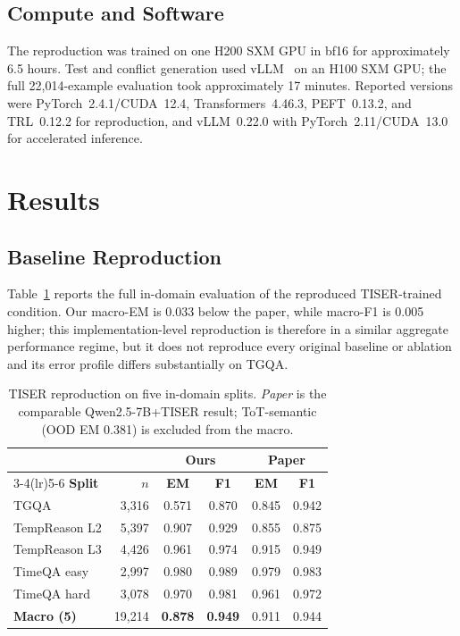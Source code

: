\documentclass[conference]{IEEEtran}
\begin{document}
\subsection{Compute and Software}

The reproduction was trained on one H200 SXM GPU in bf16 for approximately 6.5 hours. Test and conflict generation used vLLM~\cite{kwon2023vllm} on an H100 SXM GPU; the full 22,014-example evaluation took approximately 17 minutes. Reported versions were PyTorch~2.4.1/CUDA~12.4, Transformers~4.46.3, PEFT~0.13.2, and TRL~0.12.2 for reproduction, and vLLM~0.22.0 with PyTorch~2.11/CUDA~13.0 for accelerated inference.

\section{Results}

\subsection{Baseline Reproduction}

Table~\ref{tab:baseline} reports the full in-domain evaluation of the reproduced TISER-trained condition. Our macro-EM is 0.033 below the paper, while macro-F1 is 0.005 higher; this implementation-level reproduction is therefore in a similar aggregate performance regime, but it does not reproduce every original baseline or ablation and its error profile differs substantially on TGQA.

\begin{table}[t]
\centering
\caption{TISER reproduction on five in-domain splits. \emph{Paper} is the comparable Qwen2.5-7B+TISER result; ToT-semantic (OOD EM 0.381) is excluded from the macro.}
\label{tab:baseline}
\setlength{\tabcolsep}{3.7pt}
{\footnotesize
\begin{tabular}{lrcccc}
\toprule
& & \multicolumn{2}{c}{\textbf{Ours}} & \multicolumn{2}{c}{\textbf{Paper}} \\
\cmidrule(lr){3-4}\cmidrule(lr){5-6}
\textbf{Split} & \textbf{$n$} & \textbf{EM} & \textbf{F1} & \textbf{EM} & \textbf{F1} \\
\midrule
TGQA            & 3{,}316 & 0.571 & 0.870 & 0.845 & 0.942 \\
TempReason L2   & 5{,}397 & 0.907 & 0.929 & 0.855 & 0.875 \\
TempReason L3   & 4{,}426 & 0.961 & 0.974 & 0.915 & 0.949 \\
TimeQA easy     & 2{,}997 & 0.980 & 0.989 & 0.979 & 0.983 \\
TimeQA hard     & 3{,}078 & 0.970 & 0.981 & 0.961 & 0.972 \\
\midrule
\rowcolor{gray!18}
\textbf{Macro (5)} & 19{,}214 & \textbf{0.878} & \textbf{0.949} & 0.911 & 0.944 \\
\bottomrule
\end{tabular}
}
\end{table}
\end{document}
